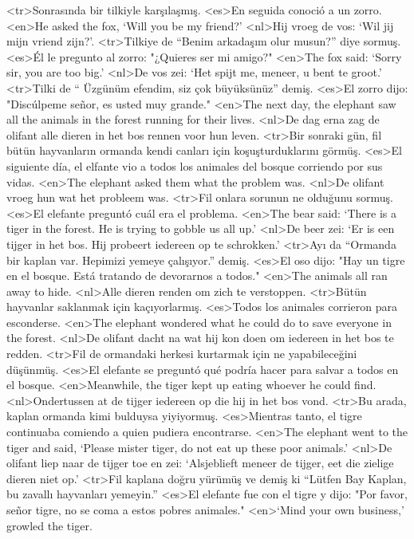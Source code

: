 <tr>Sonrasında bir tilkiyle karşılaşmış. 
<es>En seguida conoció a un zorro. 
<en>He asked the fox, `Will you be my friend?' 
<nl>Hij vroeg de vos: `Wil jij mijn vriend zijn?'.  
<tr>Tilkiye de “Benim arkadaşım olur musun?” diye sormuş. 
<es>Él le pregunto al zorro: "¿Quieres ser mi amigo?"
<en>The fox said: `Sorry sir, you are too big.' 
<nl>De vos zei: `Het spijt me, meneer, u bent te groot.'  
<tr>Tilki de “ Üzgünüm efendim, siz çok büyüksünüz” demiş. 
<es>El zorro dijo: "Discúlpeme señor, es usted muy grande."
<en>The next day, the elephant saw all the animals in the forest running for their lives. 
<nl>De dag erna  zag de olifant alle dieren in het bos rennen voor hun leven. 
<tr>Bir sonraki gün, fil bütün hayvanların ormanda kendi canları için koşuşturduklarını görmüş. 
<es>El siguiente día, el elfante vio a todos los animales del bosque corriendo por sus vidas.
<en>The elephant asked them what the problem was. 
<nl>De olifant vroeg hun wat het probleem was.  
<tr>Fil onlara sorunun ne olduğunu sormuş. 
<es>El elefante preguntó cuál era el problema.
<en>The bear said: `There is a tiger in the forest. He is trying to gobble us all up.' 
<nl>De beer zei: `Er is een tijger in het bos. Hij probeert iedereen op te schrokken.'  
<tr>Ayı da “Ormanda bir kaplan var. Hepimizi yemeye çalışıyor.” demiş. 
<es>El oso dijo: "Hay un tigre en el bosque. Está tratando de devorarnos a todos."
<en>The animals  all ran away to hide. 
<nl>Alle dieren renden om zich te verstoppen.  
<tr>Bütün hayvanlar saklanmak için kaçıyorlarmış. 
<es>Todos los animales corrieron para esconderse.
<en>The elephant wondered what he could do to save everyone in the forest. 
<nl>De olifant dacht na wat hij kon doen om iedereen in het bos te redden.  
<tr>Fil de ormandaki herkesi kurtarmak için ne yapabileceğini düşünmüş. 
<es>El elefante se preguntó qué podría hacer para salvar a todos en el bosque.
<en>Meanwhile, the tiger kept up eating whoever he could find. 
<nl>Ondertussen at de tijger iedereen op die hij in het bos vond.  
<tr>Bu arada, kaplan ormanda kimi bulduysa yiyiyormuş. 
<es>Mientras tanto, el tigre continuaba comiendo a quien pudiera encontrarse.
<en>The elephant went to the tiger and said, `Please mister tiger, do not eat up these poor animals.' 
<nl>De olifant liep naar de tijger toe en zei: `Alsjeblieft meneer de tijger, eet die zielige dieren niet op.'  
<tr>Fil kaplana doğru yürümüş ve demiş ki “Lütfen Bay Kaplan, bu zavallı hayvanları yemeyin.”  
<es>El elefante fue con el tigre y dijo: "Por favor, señor tigre, no se coma a estos pobres animales."
<en>`Mind your own business,' growled the tiger. 
